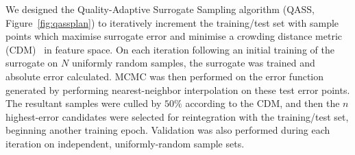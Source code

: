 We designed the Quality-Adaptive Surrogate Sampling algorithm (QASS,
Figure~\ref{fig:qassplan}) to iteratively increment the training/test set with sample
points which maximise surrogate error and minimise a crowding distance metric
(CDM)~\cite{Solonen2012} in feature space. On each iteration following an initial training of the surrogate on $N$ uniformly random samples, the surrogate was trained and absolute error calculated. MCMC was then performed on the error function generated by performing nearest-neighbor interpolation on these test error points. The resultant samples were culled by $50\%$ according to the CDM, and then the $n$ highest-error candidates were selected for reintegration with the training/test set, beginning another training epoch. Validation was also performed during each iteration on independent, uniformly-random sample sets.

